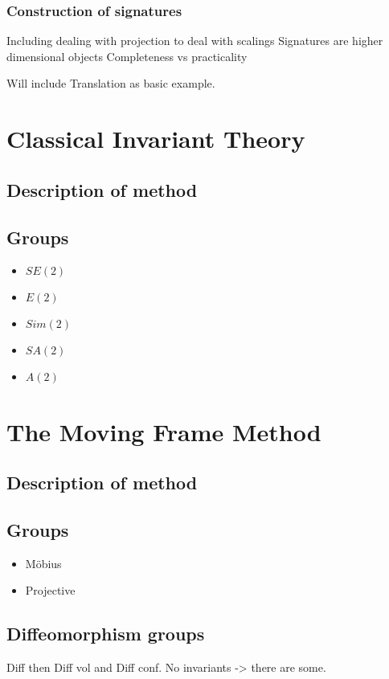 \documentclass{article}
\begin{document}
\subsubsection{Construction of signatures}
Including dealing with projection to deal with scalings
Signatures are higher dimensional objects 
Completeness vs practicality

Will include Translation as basic example.

\section{Classical Invariant Theory}
\subsection{Description of method}
\subsection{Groups}
\begin{itemize}
    \item $SE(2)$
    \item $E(2)$
    \item $Sim(2)$
    \item $SA(2)$
    \item $A(2)$
\end{itemize}

\section{The Moving Frame Method}
\subsection{Description of method}
\subsection{Groups}
\begin{itemize}
    \item M\"obius
    \item Projective
\end{itemize}

\subsection{Diffeomorphism groups}
Diff then Diff vol and Diff conf. No invariants -> there are some.
\end{document}

